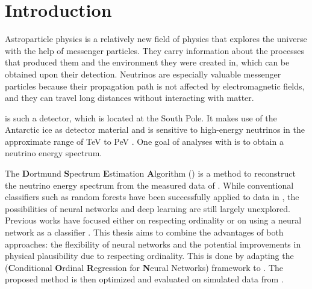 \chapter{Introduction}
Astroparticle physics is a relatively new field of physics
  that explores the universe
    with the help of messenger particles.
They carry information about
    the processes that produced them
    and the environment they were created in,
  which can be obtained upon their detection.
Neutrinos are especially valuable messenger particles
  because their propagation path is not affected by electromagnetic fields,
  and they can travel long distances without interacting with matter.


\icecube{} is such a detector,
  which is located at the South Pole.
It makes use of the Antarctic ice as detector material
  and is sensitive to high-energy neutrinos
    in the approximate range of \si{\tera\electronvolt} to \si{\peta\electronvolt} \cite{icecube_aartsen}.
%
One goal of analyses with \icecube{} is
  to obtain a neutrino energy spectrum.

The \textbf{D}ortmund \textbf{S}pectrum \textbf{E}stimation \textbf{A}lgorithm (\dsea{}) \cite{dsea_unification}
is a method to reconstruct the neutrino energy spectrum
  from the measured data of \icecube{}.
While conventional classifiers 
  such as random forests
have been successfully applied to \icecube{} data in \dsea{},
the possibilities of neural networks and deep learning are still largely unexplored. %
%
Previous works
have focused either
  on respecting ordinality \cite{dsea_jan} %
  or on using a neural network as a classifier \cite{dsea_samuel}.
This thesis aims to combine the advantages of both approaches:
  the flexibility of neural networks
  and the potential improvements in physical plausibility
    due to respecting ordinality.
This is done by adapting the
\corn{} (\textbf{C}onditional \textbf{O}rdinal \textbf{R}egression for \textbf{N}eural Networks) framework \cite{corn}
to \dsea{}.
The proposed method is then optimized and evaluated
  on simulated data from \icecube{}.

